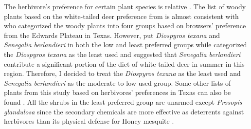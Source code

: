 \documentclass{ttuthes2007}
\begin{document}
The herbivore’s preference for certain plant species is relative \citep{wright2003white}. The list of woody plants based on the white-tailed deer preference from \citep{wright2003white} is almost consistent with \citep{nelle1996management} who categorized the woody plants into four groups based on browsers’ preference from the Edwards Plateau in Texas. However,  \citep{wright2003white} put \emph{Diospyros texana} and \emph{Senegalia berlandieri} in both the low and least preferred groups while \citep{nelle1996management} categorized the \emph{Diospyros texana} as the least used and \citep*{varner1987southern} suggested that \emph{Senegalia berlandieri} contribute a significant portion of the diet of white-tailed deer in summer in this region.  Therefore, I decided to treat the \emph{Diospyros texana} as the least used and \emph{Senegalia berlandieri} as the moderate to low used group. Some other lists of plants from this study based on herbivores’ preferences in Texas can also be found \citep{arnold1979seasonallist, nelle2001ecological, everitt1974springfoodhabit, dillard2006whitetaileddeer}. %
All the shrubs in the least preferred group are unarmed except \emph{Prosopis glandulosa} since the secondary chemicals are more effective as deterrents against herbivores than its physical defense for Honey mesquite \citep{wright2003white}.
\end{document}
